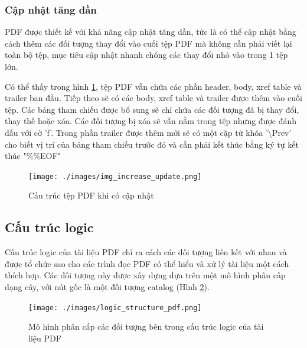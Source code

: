 \documentclass[./../main.tex]{subfiles}
\begin{document}
\subsubsection*{Cập nhật tăng dần}
PDF được thiết kế với khả năng cập nhật tăng dần, tức là có thể cập nhật bằng cách thêm các đối tượng thay đổi vào cuối tệp PDF mà không cần phải viết lại toàn bộ tệp, mục tiêu cập nhật nhanh chóng các thay đổi nhỏ vào trong 1 tệp lớn.

Có thể thấy trong hình \ref{fig:update}, tệp PDF vẫn chứa các phần header, body, xref table và trailer ban đầu. Tiếp theo sẽ có các body, xref table và trailer được thêm vào cuối tệp. Các bảng tham chiếu được bổ sung sẽ chỉ chứa các đối tượng đã bị thay đổi, thay thế  hoặc xóa. Các đối tượng bị xóa sẽ vẫn nằm trong tệp nhưng được đánh dấu với cờ 'f'.  Trong phần trailer được thêm mới sẽ có một cặp từ khóa '\textbackslash Prev' cho biết vị trí của bảng tham chiếu trước đó và cần phải kết thúc bằng ký tự kết thúc "\%\%EOF"
\begin{figure}[ht!]
	\centering
	\texttt{[image: ./images/img\_increase\_update.png]}
	\caption{Cấu trúc tệp PDF khi có cập nhật}
	\label{fig:update}
\end{figure}



\subsection{Cấu trúc logic}

Cấu trúc logic của tài liệu PDF chỉ ra cách các đối tượng liên kết với nhau và được tổ chức sao cho các trình đọc PDF có thể hiểu và xử lý tài liệu một cách thích hợp. Các đối tượng này được xây dựng dựa trên một mô hình phân cấp dạng cây, với nút gốc là một đối tượng catalog (Hình \ref{fig:logic_structure}).

\begin{figure}[ht!]
	\centering
	\texttt{[image: ./images/logic\_structure\_pdf.png]}
	\caption{Mô hình phân cấp các đối tượng bên trong cấu trúc logic của tài liệu PDF}
	\label{fig:logic_structure}
\end{figure}
\end{document}
